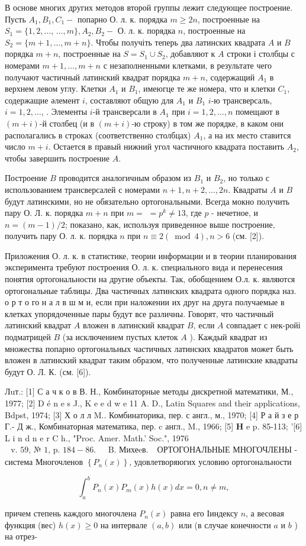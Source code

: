 \documentclass[10pt]{article}
\begin{document}
В основе многих других методов второй группы лежит следующее построение. Пусть $A_{1}, B_{1}, C_{1}-$ попарно О. л. к. порядка $m \geqslant 2 n$, построенные на $S_{1}=\{1,2, \ldots$, $\ldots, m\}, A_{2}, B_{2}-$ О. л. к. порядка $n$, построенные на $S_{2}=\{m+1, \ldots, m+n\}$. Чтобы получіть теперь два латинских квадрата $A$ и $B$ порядка $m+n$, построенные на $S=S_{1} \cup S_{2}$, добавляют к $A$ строки і столбцы с номерами $m+1, \ldots, m+n$ с незаполненными клетками, в результате чего получают частичный латинский квадрат порядка $m+n$, содержащий $A_{1}$ в верхнем левом углу. Клетки $A_{1}$ и $B_{1}$, имеюгце те же номера, что и клетки $C_{1}$, содержащие әлемент $i$, составляют общую для $A_{1}$ и $B_{1}$ $i$-ю трансверсаль, $i=1,2, \ldots$, . Элементы $i$-й трансверсали в $A_{1}$ при $i=1,2, \ldots, n$ помещают в $(m+i)$-й столбец (и в $(m+i)$-ю строку) в том же порядке, в каком они располагались в строках (соответственно столбцах) $A_{1}$, а на их место ставится число $m+i$. Остается в правый нижний угол частичного квадрата поставить $A_{2}$, чтобы завершить построение $A$.

Построение $B$ проводится аналогичным образом из $B_{1}$ и $B_{2}$, но только с использованием трансверсалей с номерами $n+1, n+2, \ldots, 2 n$. Квадраты $A$ и $B$ будут латинскими, но не обязательно ортогональными. Всегда мокно получить пару О. Л. к. порядка $m+n$ при $m=$ $=p^{k} \neq 13$, где $p$ - нечетное, и $n=(m-1) / 2$; показано, как, используя приведенное выше построение, получить пару О. л. к. порядка $n$ при $n \equiv 2(\bmod 4), n>6$ (см. [2]).

Приложения О. л. к. в статистике, теории информации и в теории планирования эксперимента требуют построения О. л. к. специального вида и перенесения понятия ортогональности на другие объекты. Так, обобщением О.л. к. являются ортогональные таблицы. Два частичных латинских квадрата одного порядка наз. о р т о го н а л в ш м и, если при наложении их друг на друга получаемые в клетках упорядоченные пары будут все различны. Говорят, что частичный латинский квадрат $A$ вложен в латинский квадрат $B$, если $A$ совпадает с нек-ройі подматрицей $B$ (за исключением пустых клеток $A$ ). Каждый квадрат из множества попарно ортогональных частичных латинских квадратов может быть вложен в латинский квадрат таким образом, что полученные латинские квадраты будут О. Л. К. (см. [6]).

Лuт.: [1] С а ч к о в В. Н., Комбинаторные методы дискретной математики, М., 1977; [2] D é n e s J., K e e d w e 11 A. D., Latin Squares and their applications, Bdpst, 1974; [3] Х о л л M.. Комбинаторика, пер. с англ., м., 1970; [4] Р а й з е р Г.- Д ж., Комбинаторная математика, пер. c англ., M., 1966; [5] $\mathbf{H}$ e p. 85-113; '[6] L i n d n e r C h., "Proc. Amer. Math.' Soc.", 1976 $\begin{array}{ll}\text { v. } 59 \text {, № 1, p. } 184-86 \text {. } & \text { B. Михеeв. }\end{array}$ ОРТОГОНАЛЬНЫЕ МНОГОЧЛЕНЫ - система Многочленов $\left\{P_{n}(x)\right\}$, удовлетворяюгих условию ортогональности

\[
\int_{a}^{b} P_{n}(x) P_{m}(x) h(x) d x=0, n \neq m,
\]

причем степень каждого многочлена $P_{n}(x)$ равна его Іиндексу $n$, а весовая функция (вес) $h(x) \geqslant 0$ на интервале $(a, b)$ или (в случае конечности $a$ и $b$ ) на отрез-
\end{document}
